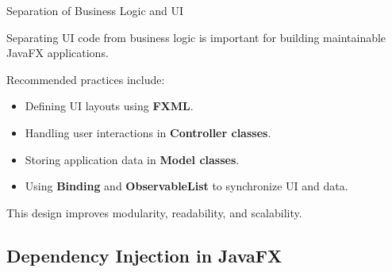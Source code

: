\documentclass[aspectratio=169, table]{beamer}
\begin{document}
\begin{frame}[fragile]{Separation of Business Logic and UI}
\vspace{20pt}

Separating UI code from business logic is important for building maintainable JavaFX applications.

\bigskip

Recommended practices include:

\begin{itemize}
\item Defining UI layouts using \textbf{FXML}.
\item Handling user interactions in \textbf{Controller classes}.
\item Storing application data in \textbf{Model classes}.
\item Using \textbf{Binding} and \textbf{ObservableList} to synchronize UI and data.
\end{itemize}

\bigskip

This design improves modularity, readability, and scalability.

\end{frame}



\subsection{Dependency Injection in JavaFX}
\end{document}
